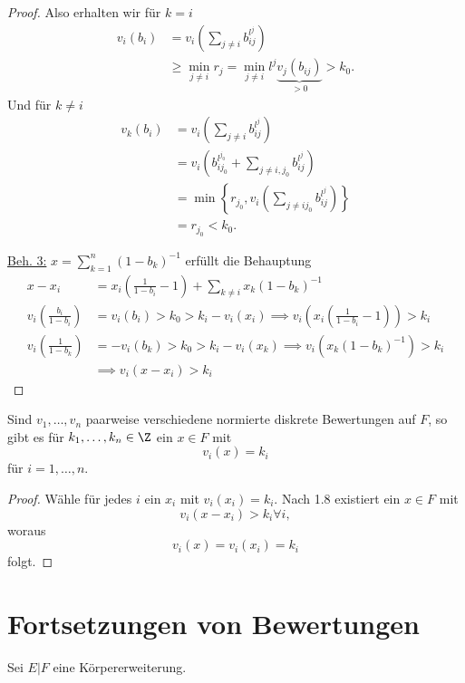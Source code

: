 \begin{proof}
    Also erhalten wir für $k=i$
    \begin{align*}
        v_i(b_i) &= v_i\left(\sum_{j \ne i} b_{ij}^{l^j}\right)\\
            & \geq \min_{j \ne i} r_j = \min_{j \ne i} l^j \underbrace{v_j(b_{ij})}_{> 0} > k_0.
    \end{align*}
    Und für $k \ne i$
    \begin{align*}
        v_k(b_i) &= v_i\left(\sum_{j \ne i} b_{ij}^{l^j}\right)\\
            & = v_i\left(b_{ij_0}^{l^{j_0}} + \sum_{j \ne i,j_0} b_{ij}^{l^j}\right)\\
            & = \min \left\{r_{j_0}, v_i\left(\sum_{j \ne ij_0} b_{ij}^{l^j}\right)\right\}\\
            & = r_{j_0} < k_0.
    \end{align*}

    \underline{Beh. 3:} $ x = \sum\limits_{k=1}^n (1-b_k)^{-1}$ erfüllt die Behauptung
    \begin{align*}
        x - x_i &= x_i \left(\frac{1}{1-b_i} - 1\right) + \sum\limits_{k\ne i} x_k (1-b_k)^{-1}\\
        v_i\left(\frac{b_i}{1-b_i}\right) &= v_i(b_i) > k_0 > k_i - v_i(x_i) \implies v_i\left(x_i\left(\frac{1}{1-b_i} - 1\right)\right) > k_i\\
        v_i\left(\frac{1}{1-b_k}\right) &= - v_i(b_k) > k_0 > k_i - v_i(x_k) \implies v_i(x_k(1-b_k)^{-1}) > k_i\\
        & \implies v_i(x-x_i) > k_i
    \end{align*}

\end{proof}

\begin{korollar}
    Sind $v_1,\ldots,v_n$ paarweise verschiedene normierte diskrete Bewertungen auf $F$, so gibt es für $k_1,\ldots,k_n \in \Z$
    ein $x \in F$ mit
    $$ v_i(x) = k_i$$
    für $i= 1,\ldots,n$.
\end{korollar}
\begin{proof}
    Wähle für jedes $i$ ein $x_i$ mit $v_i(x_i)=k_i$. 
    Nach 1.8 existiert ein $x \in F$ mit $$v_i(x-x_i) > k_i \forall i,$$
    woraus $$ v_i(x) = v_i(x_i) = k_i$$
    folgt.
\end{proof}

\section{Fortsetzungen von Bewertungen}
Sei $E|F$ eine Körpererweiterung.

